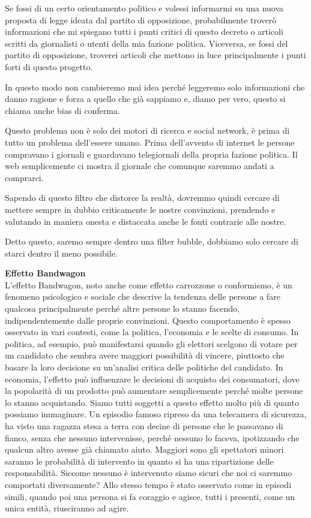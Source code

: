 \documentclass[12pt]{book} %
\begin{document}
Se fossi di un certo orientamento politico e volessi informarmi su una nuova proposta di legge ideata dal partito di
opposizione, probabilmente troverò informazioni che mi spiegano tutti i punti critici di questo decreto o articoli
scritti da giornalisti o utenti della mia fazione politica. Viceversa, se fossi del partito di opposizione, troverei
articoli che mettono in luce principalmente i punti forti di questo progetto.

In questo modo non cambieremo mai idea perché leggeremo solo informazioni che danno ragione e forza a quello che già
sappiamo e, diamo per vero, questo si chiama anche bias di conferma.

Questo problema non è solo dei motori di ricerca e social network, è prima di tutto un problema
dell'essere umano. Prima dell'avvento di internet le persone compravano i
giornali e guardavano telegiornali della propria fazione politica. Il web semplicemente ci mostra il giornale che
comunque saremmo andati a comprarci.

Sapendo di questo filtro che distorce la realtà, dovremmo quindi cercare di mettere sempre in dubbio criticamente le
nostre convinzioni, prendendo e valutando in maniera onesta e distaccata anche le fonti contrarie alle nostre.

Detto questo, saremo sempre dentro una filter bubble, dobbiamo solo cercare di starci dentro il meno possibile.


\bigskip

\noindent \textbf{\large Effetto Bandwagon} \\
L'effetto Bandwagon, noto anche come effetto carrozzone o conformismo, è un fenomeno psicologico e
sociale che descrive la tendenza delle persone a fare qualcosa principalmente perché altre persone lo stanno facendo,
indipendentemente dalle proprie convinzioni. Questo comportamento è spesso osservato in vari contesti, come la
politica, l'economia e le scelte di consumo. In politica, ad esempio, può manifestarsi quando gli
elettori scelgono di votare per un candidato che sembra avere maggiori possibilità di vincere, piuttosto che basare la
loro decisione su un'analisi critica delle politiche del candidato. In economia,
l'effetto può influenzare le decisioni di acquisto dei consumatori, dove la popolarità di un
prodotto può aumentare semplicemente perché molte persone lo stanno acquistando. Siamo tutti soggetti a questo effetto
molto più di quanto possiamo immaginare. Un episodio famoso ripreso da una telecamera di sicurezza, ha visto una
ragazza stesa a terra con decine di persone che le passavano di fianco, senza che nessuno intervenisse, perché nessuno
lo faceva, ipotizzando che qualcun altro avesse già chiamato aiuto. Maggiori sono gli spettatori minori saranno le
probabilità di intervento in quanto si ha una ripartizione delle responsabilità. Siccome nessuno è intervenuto siamo
sicuri che noi ci saremmo comportati diversamente? Allo stesso tempo è stato osservato come in episodi simili, quando
poi una persona si fa coraggio e agisce, tutti i presenti, come un unica entità, riusciranno ad agire.
\end{document}

